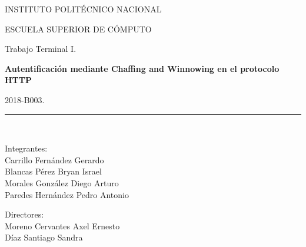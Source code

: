 \documentclass[12pt, a4paper, titlepage]{article}
\begin{document}
\begin{titlepage}
		\begin{center}
			
			\begin{LARGE}
				\textcolor{guindapoli}{INSTITUTO POLITÉCNICO NACIONAL}\\
			\end{LARGE}	
			
			\vspace*{0.2in}
			
			\begin{Large}
				\textcolor{azulescom}{ESCUELA SUPERIOR DE CÓMPUTO}\\
			\end{Large}		
			
			\vspace*{0.4in}
			
			\begin{large}
				Trabajo Terminal I.\\
			\end{large}
			
			\vspace*{0.2in}
			
			\begin{Large}
				\textbf{Autentificación mediante Chaffing and Winnowing en el protocolo HTTP}\\
			\end{Large}
			
			\vspace*{0.2in}
			
			\begin{large}
				2018-B003.\\
			\end{large}
			
			\vspace*{0.2in}
			
			\rule{80mm}{.1mm}\\
			\vspace*{0.1in}
			
			\begin{large}
				\begin{center}
					Integrantes:\\
					Carrillo Fernández Gerardo\\
					Blancas Pérez Bryan Israel\\
					Morales González Diego Arturo\\
					Paredes Hernández Pedro Antonio\\
				\end{center}
			\end{large}
			
			\begin{large}
				Directores:\\
				Moreno Cervantes Axel Ernesto\\
				Díaz Santiago Sandra\\
			\end{large}
			
		\end{center}
	
	\end{titlepage}
\end{document}
